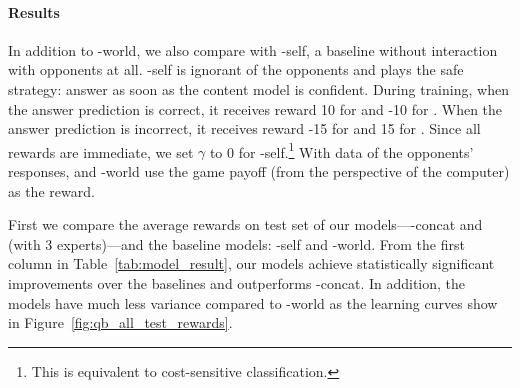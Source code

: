 \paragraph{Results}

In addition to \dqn{}-world, we also compare with \dqn{}-self, a
baseline without interaction with opponents at all. \dqn{}-self is
ignorant of the opponents and plays the safe strategy:
answer as soon as the content model is confident.  During training, when the answer
prediction is correct, it receives reward 10 for  and -10 for
.  When the answer prediction is incorrect, it receives
reward -15 for  and 15 for .  Since all rewards
are immediate, we set $\gamma$ to 0 for \dqn{}-self.\footnote{This is equivalent to cost-sensitive classification.}
With data of the
opponents' responses, \dron{} and \dqn{}-world use the game payoff
(from the perspective of the computer) as the reward.

 

First we compare the average rewards on test set of our models---\dron{}-concat
and \dronmoe{} (with 3 experts)---and the baseline models: \dqn{}-self and
\dqn{}-world.  From the first column in Table~\ref{tab:model_result}, our models
achieve statistically significant improvements over the \dqn{} baselines and
\dronmoe{} outperforms \dron{}-concat.
In addition, the \dron{} models have much less variance compared to \dqn{}-world as the learning curves show in Figure~\ref{fig:qb_all_test_rewards}.


